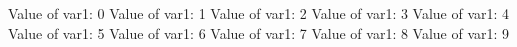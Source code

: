 Value of var1: 0
Value of var1: 1
Value of var1: 2
Value of var1: 3
Value of var1: 4
Value of var1: 5
Value of var1: 6
Value of var1: 7
Value of var1: 8
Value of var1: 9
